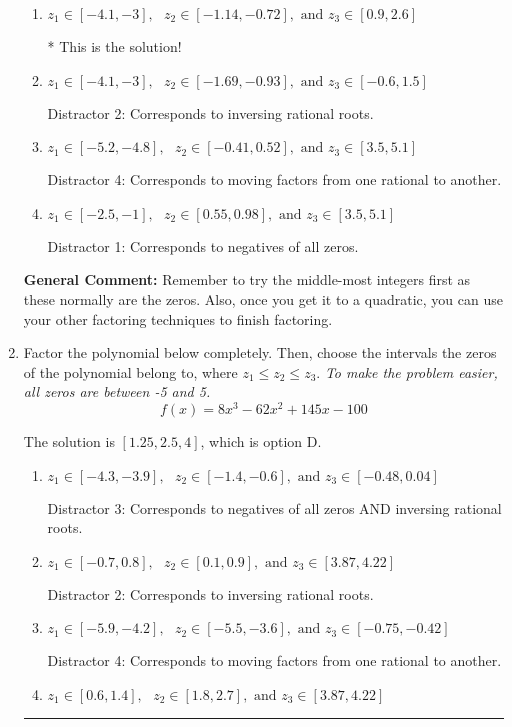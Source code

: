 \documentclass{extbook}[14pt]
\newcommand{\litem}[1]{\item #1

\rule{\textwidth}{0.4pt}}
\begin{document}
\begin{enumerate}
{\begin{enumerate}[label=\Alph*.]
 Distractor 3: Corresponds to negatives of all zeros AND inversing rational roots.
\item \( z_1 \in [-4.1, -3], \text{   }  z_2 \in [-1.14, -0.72], \text{   and   } z_3 \in [0.9, 2.6] \)

* This is the solution!
\item \( z_1 \in [-4.1, -3], \text{   }  z_2 \in [-1.69, -0.93], \text{   and   } z_3 \in [-0.6, 1.5] \)

 Distractor 2: Corresponds to inversing rational roots.
\item \( z_1 \in [-5.2, -4.8], \text{   }  z_2 \in [-0.41, 0.52], \text{   and   } z_3 \in [3.5, 5.1] \)

 Distractor 4: Corresponds to moving factors from one rational to another.
\item \( z_1 \in [-2.5, -1], \text{   }  z_2 \in [0.55, 0.98], \text{   and   } z_3 \in [3.5, 5.1] \)

 Distractor 1: Corresponds to negatives of all zeros.
\end{enumerate}

\textbf{General Comment:} Remember to try the middle-most integers first as these normally are the zeros. Also, once you get it to a quadratic, you can use your other factoring techniques to finish factoring.
}
\litem{
Factor the polynomial below completely. Then, choose the intervals the zeros of the polynomial belong to, where $z_1 \leq z_2 \leq z_3$. \textit{To make the problem easier, all zeros are between -5 and 5.}
\[ f(x) = 8x^{3} -62 x^{2} +145 x -100 \]

The solution is \( [1.25, 2.5, 4] \), which is option D.\begin{enumerate}[label=\Alph*.]
\item \( z_1 \in [-4.3, -3.9], \text{   }  z_2 \in [-1.4, -0.6], \text{   and   } z_3 \in [-0.48, 0.04] \)

 Distractor 3: Corresponds to negatives of all zeros AND inversing rational roots.
\item \( z_1 \in [-0.7, 0.8], \text{   }  z_2 \in [0.1, 0.9], \text{   and   } z_3 \in [3.87, 4.22] \)

 Distractor 2: Corresponds to inversing rational roots.
\item \( z_1 \in [-5.9, -4.2], \text{   }  z_2 \in [-5.5, -3.6], \text{   and   } z_3 \in [-0.75, -0.42] \)

 Distractor 4: Corresponds to moving factors from one rational to another.
\item \( z_1 \in [0.6, 1.4], \text{   }  z_2 \in [1.8, 2.7], \text{   and   } z_3 \in [3.87, 4.22] \)


\end{enumerate}}
\end{enumerate}
\end{document}
